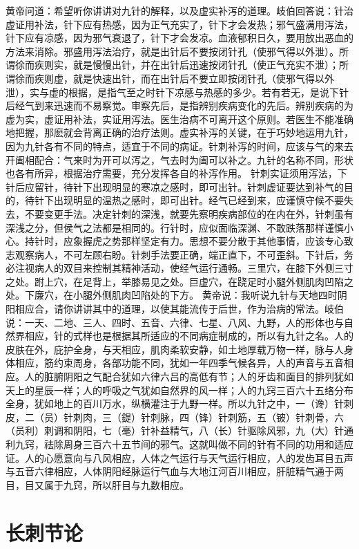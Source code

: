 \documentclass[a4paper,12pt,UTF8,twoside]{ctexbook}
\begin{document}
黄帝问道：希望听你讲讲对九针的解释，以及虚实补泻的道理。岐伯回答说：针治虚证用补法，针下应有热感，因为正气充实了，针下才会发热；邪气盛满用泻法，针下应有凉感，因为邪气衰退了，针下才会发凉。血液郁积日久，要用放出恶血的方法来消除。邪盛用泻法治疗，就是出针后不要按闭针孔（使邪气得以外泄）。所谓徐而疾则实，就是慢慢出针，并在出针后迅速按闭针孔（使正气充实不泄）；所谓徐而疾则虚，就是快速出针，而在出针后不要立即按闭针孔（使邪气得以外泄），实与虚的根据，是指气至之时针下凉感与热感的多少。若有若无，是说下针后经气到来迅速而不易察觉。审察先后，是指辨别疾病变化的先后。辨别疾病的为虚为实，虚证用补法，实证用泻法。医生治病不可离开这个原则。若医生不能准确地把握，那麽就会背离正确的治疗法则。虚实补泻的关键，在于巧妙地运用九针，因为九针各有不同的特点，适宜于不同的病证。针刺补泻的时间，应该与气的来去开阖相配合：气来时为开可以泻之，气去时为阖可以补之。九针的名称不同，形状也各有所异，根据治疗需要，充分发挥各自的补泻作用。
针刺实证须用泻法，下针后应留针，待针下出现明显的寒凉之感时，即可出针。针刺虚证要达到补气的目的，待针下出现明显的温热之感时，即可出针。经气已经到来，应谨慎守候不要失去，不要变更手法。决定针刺的深浅，就要先察明疾病部位的在内在外，针刺虽有深浅之分，但侯气之法都是相同的。行针时，应似面临深渊、不敢跌落那样谨慎小心。持针时，应象握虎之势那样坚定有力。思想不要分散于其他事情，应该专心致志观察病人，不可左顾右盼。针刺手法要正确，端正直下，不可歪斜。下针后，务必注视病人的双目来控制其精神活动，使经气运行通畅。三里穴，在膝下外侧三寸之处。跗上穴，在足背上，举膝易见之处。巨虚穴，在跷足时小腿外侧肌肉凹陷之处。下廉穴，在小腿外侧肌肉凹陷处的下方。
黄帝说：我听说九针与天地四时阴阳相应合，请你讲讲其中的道理，以使其能流传于后世，作为治病的常法。岐伯说：一天、二地、三人、四时、五音、六律、七星、八风、九野，人的形体也与自然界相应，针的式样也是根据其所适应的不同病症制成的，所以有九针之名。人的皮肤在外，庇护全身，与天相应，肌肉柔软安静，如土地厚载万物一样，脉与人身体相应，筋约束周身，各部功能不同，犹如一年四季气候各异，人的声音与五音相应。人的脏腑阴阳之气配合犹如六律六吕的高低有节；人的牙齿和面目的排列犹如天上的星辰一样；人的呼吸之气犹如自然界的风一样；人的九窍三百六十五络分布全身，犹如地上的百川万水，纵横灌注于九野一样。所以九针之中，一（谗）针刺皮，二（员）针刺肉，三（鍉）针刺脉，四（锋）针刺筋，五（铍）针刺骨，六（员利）刺调和阴阳，七（毫）针补益精气，八（长）针驱除风邪，九（大）针通利九窍，祛除周身三百六十五节间的邪气。这就叫做不同的针有不同的功用和适应证。人的心愿意向与八风相应，人体之气运行与天气运行相应，人的发齿耳目五声与五音六律相应，人体阴阳经脉运行气血与大地江河百川相应，肝脏精气通于两目，目又属于九窍，所以肝目与九数相应。

\chapter{长刺节论}
\end{document}
